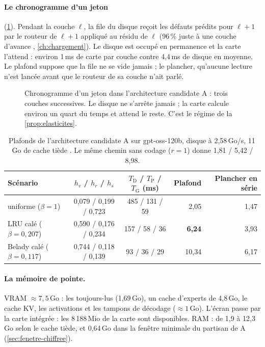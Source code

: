 \paragraph{Le chronogramme d'un jeton} (\cref{fig:chrono-a}). Pendant la couche $\ell$, la file du disque reçoit les défauts prédits pour $\ell+1$ par le routeur de $\ell+1$ appliqué au résidu de $\ell$ (96\,\% juste à une couche d'avance \litt, \cref{ch:chargement}). Le disque est occupé en permanence et la carte l'attend : environ 1\,ms de carte par couche contre 4,4\,ms de disque en moyenne. Le plafond suppose que la file ne se vide jamais ; le plancher, qu'aucune lecture n'est lancée avant que le routeur de sa couche n'ait parlé.

\begin{figure}[ht]
\centering
\SchemaChronoA
\caption[Chronogramme d'un jeton dans A]{Chronogramme d'un jeton dans l'architecture candidate A : trois couches successives. Le disque ne s'arrête jamais ; la carte calcule environ un quart du temps et attend le reste. C'est le régime de la \cref{prop:elasticites}.}
\label{fig:chrono-a}
\end{figure}

\begin{table}[ht]
\centering\small
\caption[Plafonds de A]{Plafonds de l'architecture candidate A sur gpt-oss-120b, disque à 2,58\,Go/s, 11\,Go de cache tiède \calc. Le même chemin sans codage ($r = 1$) donne 1,81 / 5,42 / 8,98.}
\label{tab:plafonds-a}
\begin{tabular}{@{}lccrr@{}}
\toprule
Scénario & $h_v$ / $h_r$ / $h_s$ & $T_{\mathrm{D}}$ / $T_{\mathrm{P}}$ / $T_{\mathrm{G}}$ (ms) & Plafond & Plancher en série \\
\midrule
uniforme ($\beta = 1$) & 0,079 / 0,199 / 0,723 & 485 / 131 / 59 & 2,05 & 1,47 \\
LRU calé ($\beta = 0{,}207$) & 0,590 / 0,176 / 0,234 & 157 / 58 / 36 & \textbf{6,24} & 3,93 \\
Belady calé ($\beta = 0{,}117$) & 0,744 / 0,118 / 0,139 & 93 / 36 / 29 & 10,34 & 6,17 \\
\bottomrule
\end{tabular}
\end{table}

\paragraph{La mémoire de pointe.} VRAM $\approx 7{,}5$\,Go : les toujours-lus (1,69\,Go), un cache d'experts de 4,8\,Go, le cache KV, les activations et les tampons de décodage ($\approx 1$\,Go). L'écran passe par la carte intégrée : les 8\,188\,Mio de la carte sont disponibles. RAM : de 1,9 à 12,3\,Go selon le cache tiède, et 0,64\,Go dans la fenêtre minimale du partisan de A (\cref{sec:fenetre-chiffree}).

